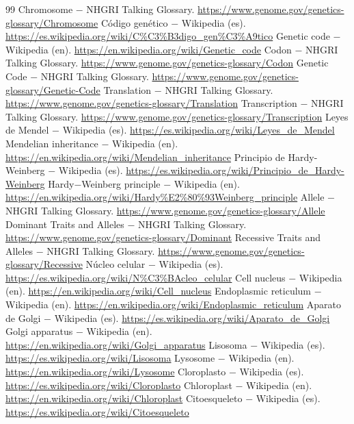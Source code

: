 \documentclass{book}
\begin{document}
\begin{thebibliography}{99}
 Chromosome \(-\) NHGRI Talking Glossary. \url{https://www.genome.gov/genetics-glossary/Chromosome}
 Código genético \(-\) Wikipedia (es). \url{https://es.wikipedia.org/wiki/C%C3%B3digo_gen%C3%A9tico}
 Genetic code \(-\) Wikipedia (en). \url{https://en.wikipedia.org/wiki/Genetic_code}
 Codon \(-\) NHGRI Talking Glossary. \url{https://www.genome.gov/genetics-glossary/Codon}
 Genetic Code \(-\) NHGRI Talking Glossary. \url{https://www.genome.gov/genetics-glossary/Genetic-Code}
 Translation \(-\) NHGRI Talking Glossary. \url{https://www.genome.gov/genetics-glossary/Translation}
 Transcription \(-\) NHGRI Talking Glossary. \url{https://www.genome.gov/genetics-glossary/Transcription}
 Leyes de Mendel \(-\) Wikipedia (es). \url{https://es.wikipedia.org/wiki/Leyes_de_Mendel}
 Mendelian inheritance \(-\) Wikipedia (en). \url{https://en.wikipedia.org/wiki/Mendelian_inheritance}
 Principio de Hardy-Weinberg \(-\) Wikipedia (es). \url{https://es.wikipedia.org/wiki/Principio_de_Hardy-Weinberg}
 Hardy\(-\)Weinberg principle \(-\) Wikipedia (en). \url{https://en.wikipedia.org/wiki/Hardy%E2%80%93Weinberg_principle}
 Allele \(-\) NHGRI Talking Glossary. \url{https://www.genome.gov/genetics-glossary/Allele}
 Dominant Traits and Alleles \(-\) NHGRI Talking Glossary. \url{https://www.genome.gov/genetics-glossary/Dominant}
 Recessive Traits and Alleles \(-\) NHGRI Talking Glossary. \url{https://www.genome.gov/genetics-glossary/Recessive}
 Núcleo celular \(-\) Wikipedia (es). \url{https://es.wikipedia.org/wiki/N%C3%BAcleo_celular}
 Cell nucleus \(-\) Wikipedia (en). \url{https://en.wikipedia.org/wiki/Cell_nucleus}
 Endoplasmic reticulum \(-\) Wikipedia (en). \url{https://en.wikipedia.org/wiki/Endoplasmic_reticulum}
 Aparato de Golgi \(-\) Wikipedia (es). \url{https://es.wikipedia.org/wiki/Aparato_de_Golgi}
 Golgi apparatus \(-\) Wikipedia (en). \url{https://en.wikipedia.org/wiki/Golgi_apparatus}
 Lisosoma \(-\) Wikipedia (es). \url{https://es.wikipedia.org/wiki/Lisosoma}
 Lysosome \(-\) Wikipedia (en). \url{https://en.wikipedia.org/wiki/Lysosome}
 Cloroplasto \(-\) Wikipedia (es). \url{https://es.wikipedia.org/wiki/Cloroplasto}
 Chloroplast \(-\) Wikipedia (en). \url{https://en.wikipedia.org/wiki/Chloroplast}
 Citoesqueleto \(-\) Wikipedia (es). \url{https://es.wikipedia.org/wiki/Citoesqueleto}

\end{thebibliography}
\end{document}
